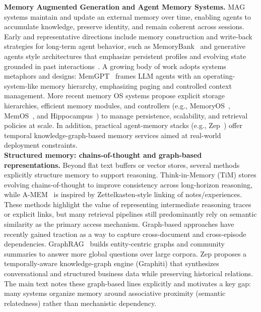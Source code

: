 \documentclass[11pt]{article}
\begin{document}
\textbf{Memory Augmented Generation and Agent Memory Systems.} MAG systems maintain and update an external memory over time, enabling agents to accumulate knowledge, preserve identity, and remain coherent across sessions. Early and representative directions include memory construction and write-back strategies for long-term agent behavior, such as MemoryBank~\cite{zhong2024memorybank} and generative agents style architectures that emphasize persistent profiles and evolving state grounded in past interactions~\cite{nan2025nemori,maharana2024evaluating,zeng2025bridging}. A growing body of work adopts systems metaphors and designs: MemGPT~\cite{packer2023memgpt} frames LLM agents with an operating-system-like memory hierarchy, emphasizing paging and controlled context management. More recent memory OS systems propose explicit storage hierarchies, efficient memory modules, and controllers (e.g., MemoryOS~\cite{kang2025memory}, MemOS~\cite{li2025memos}, and Hippocampus~\cite{li2026hippocampus}) to manage persistence, scalability, and retrieval policies at scale. In addition, practical agent-memory stacks (e.g., Zep~\cite{rasmussen2025zep}) offer temporal knowledge-graph-based memory services aimed at real-world deployment constraints.\\
\textbf{Structured memory: chains-of-thought and graph-based representations.} Beyond flat text buffers or vector stores, several methods explicitly structure memory to support reasoning. Think-in-Memory (TiM) stores evolving chains-of-thought to improve consistency across long-horizon reasoning, while A-MEM~\cite{xu2025mem} is inspired by Zettelkasten-style linking of notes/experiences. These methods highlight the value of representing intermediate reasoning traces or explicit links, but many retrieval pipelines still predominantly rely on semantic similarity as the primary access mechanism. Graph-based approaches have recently gained traction as a way to capture cross-document and cross-episode dependencies. GraphRAG~\cite{edge2024local} builds entity-centric graphs and community summaries to answer more global questions over large corpora. Zep proposes a temporally-aware knowledge-graph engine (Graphiti) that synthesizes conversational and structured business data while preserving historical relations. The main text notes these graph-based lines explicitly and motivates a key gap: many systems organize memory around associative proximity (semantic relatedness) rather than mechanistic dependency.\\
\end{document}
